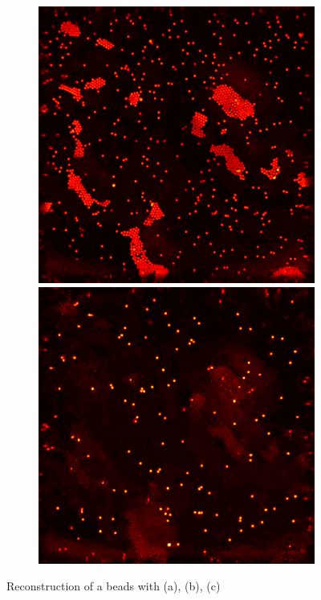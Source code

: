 \documentclass[9pt,twocolumn,twoside]{osajnl}
\begin{document}
\begin{figure}[H]
\begin{subfigure}[b]{0.95\columnwidth}
\begin{minipage}[b]{0.3\columnwidth}
    \end{minipage}
    \begin{minipage}[b]{0.3\columnwidth}
      \includegraphics[width=1\columnwidth]{twist_reobj1}
      \includegraphics[width=1\columnwidth]{twist_reobj2}
    \end{minipage}
\end{subfigure}
\caption{Reconstruction of a beads with (a), (b), (c)}
\label{fig_beads}
\end{figure}
\end{document}
